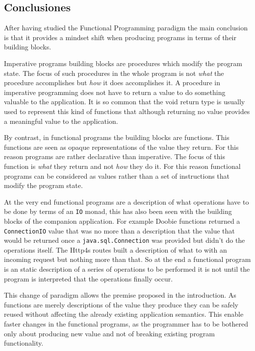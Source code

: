 \documentclass[../main.tex]{subfiles}
\begin{document}
\subsection{Conclusiones}
After having studied the Functional Programming paradigm the main conclusion is
that it provides a mindset shift when producing programs in terms of their
building blocks.

Imperative programs building blocks are procedures which modify the program
state. The focus of such procedures in the whole program is not \textit{what} the
procedure accomplishes but \textit{how} it does accomplishes it. A procedure in
imperative programming does not have to return a value to do something valuable
to the application. It is so common that the void return type is usually used to
represent this kind of functions that although returning no value provides a
meaningful value to the application.

By contrast, in functional programs the building blocks are functions. This
functions are seen as opaque representations of the value they return. For this
reason programs are rather declarative than imperative. The focus of this
function is \textit{what} they return and not \textit{how} they do it. For this
reason functional programs can be considered as values rather than a set of
instructions that modify the program state.

At the very end functional programs are a description of what operations have to
be done by terms of an \texttt{IO} monad, this has also been seen with the
building blocks of the companion application. For example Doobie functions
returned a \texttt{ConnectionIO} value that was no more than a description that
the value that would be returned once a \texttt{java.sql.Connection} was
provided but didn't do the operations itself. The Http4s routes built a
description of what to with an incoming request but nothing more than that. So
at the end a functional program is an static description of a series of
operations to be performed it is not until the program is interpreted that the
operations finally occur.

This change of paradigm allows the premise proposed in the introduction. As
functions are merely descriptions of the value they produce they can be safely
reused without affecting the already existing application semantics. This enable
faster changes in the functional programs, as the programmer has to be bothered
only about producing new value and not of breaking existing program
functionality.
\end{document}
